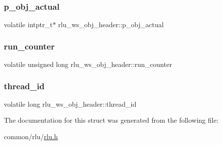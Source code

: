 \subsubsection{\texorpdfstring{p\+\_\+obj\+\_\+actual}{p\_obj\_actual}}
{\footnotesize\ttfamily volatile intptr\+\_\+t$\ast$ rlu\+\_\+ws\+\_\+obj\+\_\+header\+::p\+\_\+obj\+\_\+actual}

\mbox{\label{structrlu__ws__obj__header_ae6a758ce56333241a21ccfb10d077ff7}} 
\subsubsection{\texorpdfstring{run\+\_\+counter}{run\_counter}}
{\footnotesize\ttfamily volatile unsigned long rlu\+\_\+ws\+\_\+obj\+\_\+header\+::run\+\_\+counter}

\mbox{\label{structrlu__ws__obj__header_a01eb643ac50f12a6eeb6736a60fd60b9}} 
\subsubsection{\texorpdfstring{thread\+\_\+id}{thread\_id}}
{\footnotesize\ttfamily volatile long rlu\+\_\+ws\+\_\+obj\+\_\+header\+::thread\+\_\+id}



The documentation for this struct was generated from the following file\+:\begin{DoxyCompactItemize}
\item 
common/rlu/\hyperlink{rlu_8h}{rlu.\+h}\end{DoxyCompactItemize}
